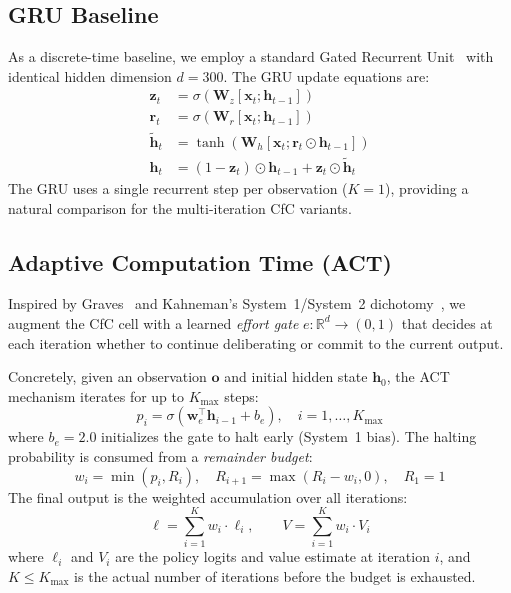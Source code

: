 \documentclass[conference]{IEEEtran}
\newcommand{\R}{\mathbb{R}}
\begin{document}
\subsection{GRU Baseline}
\label{ssec:gru}

As a discrete-time baseline, we employ a standard Gated Recurrent Unit~\cite{cho2014learning} with identical hidden dimension $d = 300$. The GRU update equations are:
\begin{align}
\bm{z}_t &= \sigma(\bm{W}_z [\bm{x}_t; \bm{h}_{t-1}]) \label{eq:gru_z} \\
\bm{r}_t &= \sigma(\bm{W}_r [\bm{x}_t; \bm{h}_{t-1}]) \label{eq:gru_r} \\
\tilde{\bm{h}}_t &= \tanh(\bm{W}_h [\bm{x}_t; \bm{r}_t \odot \bm{h}_{t-1}]) \label{eq:gru_htilde} \\
\bm{h}_t &= (1 - \bm{z}_t) \odot \bm{h}_{t-1} + \bm{z}_t \odot \tilde{\bm{h}}_t \label{eq:gru_h}
\end{align}
The GRU uses a single recurrent step per observation ($K = 1$), providing a natural comparison for the multi-iteration CfC variants.


\subsection{Adaptive Computation Time (ACT)}
\label{ssec:act}

Inspired by Graves~\cite{graves2016adaptive} and Kahneman's System~1/System~2 dichotomy~\cite{kahneman2011thinking}, we augment the CfC cell with a learned \emph{effort gate} $e: \R^d \to (0,1)$ that decides at each iteration whether to continue deliberating or commit to the current output.

Concretely, given an observation $\bm{o}$ and initial hidden state $\bm{h}_0$, the ACT mechanism iterates for up to $K_{\max}$ steps:
\begin{equation}
\label{eq:act_halting}
p_i = \sigma\!\left(\bm{w}_e^\top \bm{h}_{i-1} + b_e\right), \quad i = 1, \dots, K_{\max}
\end{equation}
where $b_e = 2.0$ initializes the gate to halt early (System~1 bias). The halting probability is consumed from a \emph{remainder budget}:
\begin{equation}
\label{eq:act_weight}
w_i = \min(p_i, R_i), \quad R_{i+1} = \max(R_i - w_i, 0), \quad R_1 = 1
\end{equation}
The final output is the weighted accumulation over all iterations:
\begin{equation}
\label{eq:act_logits}
\bm{\ell} = \sum_{i=1}^{K} w_i \cdot \bm{\ell}_i, \qquad V = \sum_{i=1}^{K} w_i \cdot V_i
\end{equation}
where $\bm{\ell}_i$ and $V_i$ are the policy logits and value estimate at iteration $i$, and $K \leq K_{\max}$ is the actual number of iterations before the budget is exhausted.
\end{document}
